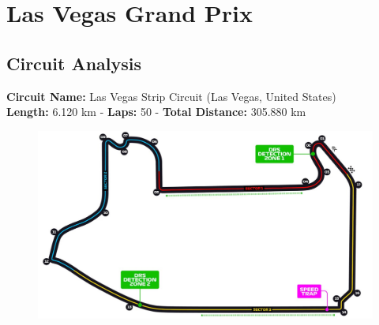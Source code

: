 \section{Las Vegas Grand Prix}

\subsection{Circuit Analysis}

\textbf{Circuit Name:} Las Vegas Strip Circuit (Las Vegas, United States) \\
\textbf{Length:} 6.120 km - \textbf{Laps:} 50 - \textbf{Total Distance:} 305.880 km

\begin{figure}[H]
    \centering
    \includegraphics[width=0.75\linewidth]{images/22.Las_Vegas_Circuit.jpg}
\end{figure}

